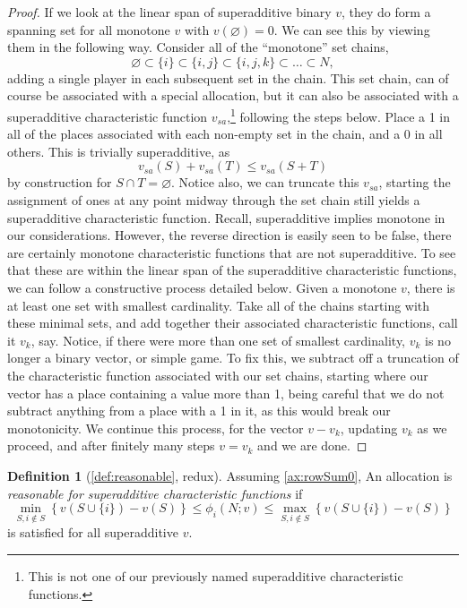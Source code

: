 \documentclass[12pt,letterpaper,final]{article}
\theoremstyle{plain}
\theoremstyle{plain}
\theoremstyle{plain}
\theoremstyle{plain}
\theoremstyle{plain}
\theoremstyle{plain}
\theoremstyle{plain}
\theoremstyle{definition}
\newtheorem{definition}{Definition}[section]
\theoremstyle{definition}
\theoremstyle{definition}
\theoremstyle{definition}
\theoremstyle{definition}
\theoremstyle{remark}
\theoremstyle{remark}
\theoremstyle{remark}
\theoremstyle{remark}
\begin{document}
\begin{proof}
  If we look at the linear span of superadditive
  binary \(v\), they do form a spanning set for all monotone \(v\)
  with \(v(\varnothing) = 0\). We can see this by viewing them in the
  following way. Consider all of the ``monotone'' set chains,
  \[
    \varnothing \subset \{i\}\subset \{i,j\}\subset \{i,j,k\} \subset \ldots
    \subset N,
  \]
  adding a single player in each subsequent set in the chain. This set chain, can
  of course be associated with a special allocation, but it can also be
  associated with a superadditive characteristic function
  \(v_{sa}\),\footnote{This is not one of our previously named
    superadditive characteristic functions.}
  following the steps below. 
  Place a 1 in all of the places associated with each non-empty set in
  the chain, and a 0 in all others. This is trivially superadditive,
  as
  \[
    v_{sa}(S) + v_{sa}(T) \leq v_{sa}(S+T)
  \]
  by construction for \(S\cap T = \varnothing\). Notice also, we can
  truncate this \(v_{sa}\), starting the assignment of ones at any
  point midway through the set chain still yields a superadditive
  characteristic function.  Recall, superadditive implies
  monotone in our considerations.
  However, the reverse direction is easily seen to be false, there are
  certainly monotone characteristic functions that are not superadditive. To see that
  these are within the linear span of the superadditive characteristic
  functions, we
  can follow a constructive process detailed below.
  Given a monotone \(v\), there is at least one set with smallest
  cardinality. Take all of the chains starting with these minimal sets,
  and add together their associated characteristic functions,
  call it \(v_{k}\), say. Notice, if there were more than one set of
  smallest cardinality, \(v_k\) is no longer a binary vector, or
  simple game. To fix
  this, we subtract off a truncation of the characteristic function associated with
  our set chains, starting where our vector has a place containing a
  value more than 1, being careful that we do not subtract anything
  from a place with a 1 in it, as this would break our monotonicity.
  We continue this process, for the vector \(v-v_k\), updating \(v_k\)
  as we proceed, and after finitely many steps \(v=v_k\) and we are done.
\end{proof}

\begin{definition}[\cref{def:reasonable}, redux]\label{def:reasonableRedux}
  Assuming \cref{ax:rowSum0}, An allocation is \emph{reasonable for
    superadditive characteristic functions} if
  \begin{equation}\label{eq:reiteratedBounds}
    \min_{S, i\notin S}\left\{ v\left(S \cup\{i\}\right) -v(S)\right\}
    \leq \phi_i(N;v) \leq \max_{S, i \notin
      S}\left\{v\left(S \cup \{i\}\right) - v(S)\right\}
  \end{equation}
  is satisfied for all superadditive \(v\).
\end{definition}
\end{document}
